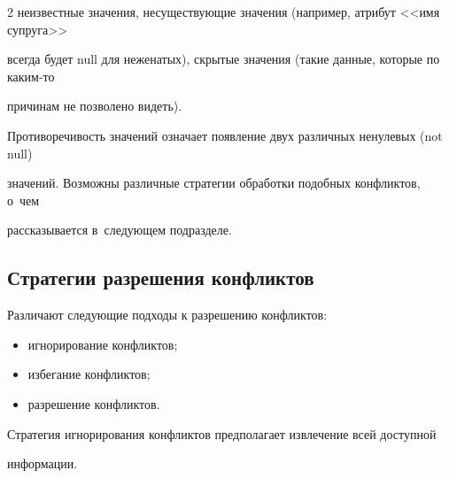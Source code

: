 \begin{multicols}{2}
неизвестные значения, несуществующие значения (например, атрибут <<имя супруга>>

всегда будет null для неженатых), скрытые значения (такие данные, которые по ка\-ким-то

причинам не позволено видеть).



  Противоречивость значений означает появление двух различных ненулевых (not null)

значений. Возможны различные стратегии обработки подобных конфликтов, о~чем

рассказывается в~сле\-ду\-ющем подразделе.







  \subsection{Стратегии разрешения конфликтов}



  Различают следующие подходы к разрешению конфликтов:

  \begin{itemize}

\item игнорирование конфликтов;

\item избегание конфликтов;

\item разрешение конфликтов.

\end{itemize}



  Стратегия игнорирования конфликтов предполагает извлечение всей доступной

информации.\linebreak\vspace*{-12pt}



\pagebreak



\end{multicols}



